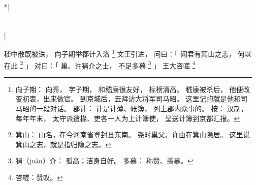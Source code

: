 
\switchcolumn[0]*[\section{}]

嵇中散既被诛，
向子期举郡计入洛%
\footnote{%
    向子期：
        向秀，
        字子期，
        和嵇康很友好，
        标榜清高。
        嵇康被杀后，
        他便改变初衷，出来做官。
        到京城后，去拜访大将军司马昭。
        这里记的就是他和司马昭的一段对话。
    郡计：
        计是计薄、帐簿，
        列上郡内众事的。
        按：
        汉制，每年年末，
        太守派遣椽、吏各一人为上计簿使，
        呈送计簿到京都汇报。
}%
文王引进，
问曰：「
    闻君有箕山之志，
    何以在此%
    \footnote{%
        箕山：
            山名，在今河南省登封县东南。
            尧时巢父、许由在箕山隐居。
            这里说箕山之志，就是指归隐之志。
    }%
」
对曰：「
    巢、许狷介之士，
    不足多慕%
    \footnote{%
        狷（juàn）介：
            孤高；洁身自好。
        多慕：
            称赞、羡慕。
    }%
」
王大咨嗟%
\footnote{%
    咨嗟：赞叹。
}%

\switchcolumn



